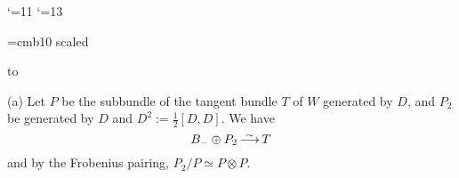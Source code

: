 

\loadeusm

\catcode`\@=11
\def\logo@{}
\catcode`\@=13

\NoRunningHeads

\font\boldtitlefont=cmb10 scaled

\def\dspace{\lineskip=2pt\baselineskip=18pt\lineskiplimit=0pt}
\def\upvee{{\sssize \vee}}
\def\w{{\mathchoice{\,{\scriptstyle\wedge}\,}
  {{\scriptstyle\wedge}}
  {{\scriptscriptstyle\wedge}}{{\scriptscriptstyle\wedge}}}}
\def\Le{{\mathchoice{\,{\scriptstyle\le}\,}
  {\,{\scriptstyle\le}\,}
  {\,{\scriptscriptstyle\le}\,}{\,{\scriptscriptstyle\le}\,}}}
\def\Ge{{\mathchoice{\,{\scriptstyle\ge}\,}
  {\,{\scriptstyle\ge}\,}
  {\,{\scriptscriptstyle\ge}\,}{\,{\scriptscriptstyle\ge}\,}}}
\def\vrulesub#1{\hbox{\,\vrule height7pt depth5pt\,}_{#1}}
\def\mapright#1{\smash{\mathop{\,\longrightarrow\,}%
     \limits^{#1}}}
\def\arrowsim{\smash{\mathop{\,\longrightarrow\,}%
   \limits^{\lower1.5pt\hbox{$\scriptstyle\sim$}}}}
\def\plus{{\sssize +}}

\def\scrLbar{\overline{\scrL}}

\def\Adot{\Dot{A}}
\def\Bdot{\Dot{B}}
\def\Xdot{\Dot{X}}
\def\xdot{\Dot{x}}
\def\phidot{\Dot{\phi}}

\def\Ber{\text{\rm Ber}} \def\pr{\text{\rm pr}}
\def\red{\text{\rm red}}


\def\scr#1{{\fam\eusmfam\relax#1}}

\def\scrA{{\scr A}}   \def\scrB{{\scr B}}
\def\scrC{{\scr C}}   \def\scrD{{\scr D}}
\def\scrE{{\scr E}}   \def\scrF{{\scr F}}
\def\scrG{{\scr G}}   \def\scrH{{\scr H}}
\def\scrI{{\scr I}}   \def\scrJ{{\scr J}}
\def\scrK{{\scr K}}   \def\scrL{{\scr L}}
\def\scrM{{\scr M}}   \def\scrN{{\scr N}}
\def\scrO{{\scr O}}   \def\scrP{{\scr P}}
\def\scrQ{{\scr Q}}   \def\scrR{{\scr R}}
\def\scrS{{\scr S}}   \def\scrT{{\scr T}}
\def\scrU{{\scr U}}   \def\scrV{{\scr V}}
\def\scrW{{\scr W}}   \def\scrX{{\scr X}}
\def\scrY{{\scr Y}}   \def\scrZ{{\scr Z}}

\NoBlackBoxes
\document
{}
\smallskip
\hbox to \hsize{\hrulefill}

\bigskip
\dspace
\noindent
(a)\enspace
Let $P$ be the subbundle of the tangent bundle $T$ of
$W$ generated by $D$, and $P_2$ be generated by $D$ and
$D^2:= \frac12[D,D]$.
We have
$$
B_-\oplus P_2\arrowsim T
$$
and by the Frobenius pairing, $P_2/P\simeq P\otimes P$.

